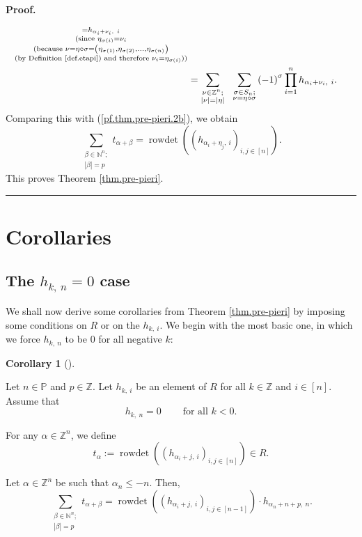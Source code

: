 \documentclass[numbers=enddot,12pt,final,onecolumn,notitlepage,english]{scrartcl}%
\theoremstyle{definition}
\newtheorem{coro}[theo]{Corollary}
\newenvironment{corollary}[1][]
{\begin{coro}[#1]\begin{leftbar}}
{\end{leftbar}\end{coro}}
\newenvironment{proof}[1][Proof]{\noindent\textbf{#1.} }{\ \rule{0.5em}{0.5em}}
\let\sumnonlimits\sum
\let\prodnonlimits\prod
\renewcommand{\sum}{\sumnonlimits\limits}
\renewcommand{\prod}{\prodnonlimits\limits}
\newenvironment{verlong}{}{}
\begin{document}
\begin{verlong}
\begin{proof}
\begin{align*}
_{\substack{=h_{\alpha_{i}+\nu_{i},\ i}\\\text{(since }\eta_{\sigma\left(
i\right)  }=\nu_{i}\\\text{(because }\nu=\eta\circ\sigma=\left(  \eta
_{\sigma\left(  1\right)  },\eta_{\sigma\left(  2\right)  },\ldots
,\eta_{\sigma\left(  n\right)  }\right)  \\\text{(by Definition
\ref{def.etapi}) and therefore }\nu_{i}=\eta_{\sigma\left(  i\right)
}\text{))}}}\\
&  =\sum_{\substack{\nu\in\mathbb{Z}^{n};\\\left\vert \nu\right\vert
=\left\vert \eta\right\vert }}\ \ \sum_{\substack{\sigma\in S_{n};\\\nu
=\eta\circ\sigma}}\left(  -1\right)  ^{\sigma}\prod_{i=1}^{n}h_{\alpha_{i}%
+\nu_{i},\ i}.
\end{align*}
Comparing this with (\ref{pf.thm.pre-pieri.2b}), we obtain%
\[
\sum_{\substack{\beta\in\mathbb{N}^{n};\\\left\vert \beta\right\vert
=p}}t_{\alpha+\beta}=\operatorname*{rowdet}\left(  \left(  h_{\alpha_{i}%
+\eta_{j},\ i}\right)  _{i,j\in\left[  n\right]  }\right)  .
\]
This proves Theorem \ref{thm.pre-pieri}.
\end{proof}
\end{verlong}

\section{Corollaries}

\subsection{The $h_{k,\ n}=0$ case}

We shall now derive some corollaries from Theorem \ref{thm.pre-pieri} by
imposing some conditions on $R$ or on the $h_{k,\ i}$. We begin with the most
basic one, in which we force $h_{k,\ n}$ to be $0$ for all negative $k$:

\begin{corollary}
\label{cor.pre-pieri.2}Let $n\in\mathbb{P}$ and $p\in\mathbb{Z}$. Let
$h_{k,\ i}$ be an element of $R$ for all $k\in\mathbb{Z}$ and $i\in\left[
n\right]  $. Assume that%
\begin{equation}
h_{k,\ n}=0\ \ \ \ \ \ \ \ \ \ \text{for all }k<0.
\label{eq.cor.pre-pieri.2.ass0}%
\end{equation}


For any $\alpha\in\mathbb{Z}^{n}$, we define%
\[
t_{\alpha}:=\operatorname*{rowdet}\left(  \left(  h_{\alpha_{i}+j,\ i}\right)
_{i,j\in\left[  n\right]  }\right)  \in R.
\]


Let $\alpha\in\mathbb{Z}^{n}$ be such that $\alpha_{n}\leq-n$. Then,%
\[
\sum_{\substack{\beta\in\mathbb{N}^{n};\\\left\vert \beta\right\vert
=p}}t_{\alpha+\beta}=\operatorname*{rowdet}\left(  \left(  h_{\alpha
_{i}+j,\ i}\right)  _{i,j\in\left[  n-1\right]  }\right)  \cdot h_{\alpha
_{n}+n+p,\ n}.
\]

\end{corollary}
\end{document}
